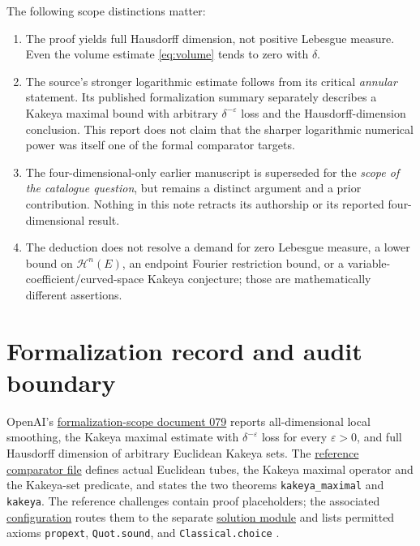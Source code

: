 \documentclass[11pt,a4paper]{article}
\numberwithin{equation}{section}
\theoremstyle{definition}
\theoremstyle{remark}
\newcommand{\eps}{\varepsilon}
\newcommand{\Hs}{\mathcal H}
\begin{document}
The following scope distinctions matter:
\begin{enumerate}[label=(\alph*)]
\item The proof yields full Hausdorff dimension, not positive
Lebesgue measure. Even the volume estimate \eqref{eq:volume} tends
to zero with $\delta$.
\item The source's stronger logarithmic estimate follows from its
critical \emph{annular} statement. Its published formalization summary
separately describes a Kakeya maximal bound with arbitrary
$\delta^{-\eps}$ loss and the Hausdorff-dimension conclusion. This
report does not claim that the sharper logarithmic numerical power
was itself one of the formal comparator targets.
\item The four-dimensional-only earlier manuscript is superseded for
the \emph{scope of the catalogue question}, but remains a distinct
argument and a prior contribution. Nothing in this note retracts
its authorship or its reported four-dimensional result.
\item The deduction does not resolve a demand for zero Lebesgue measure,
a lower bound on $\Hs^n(E)$, an endpoint Fourier restriction bound, or
a variable-coefficient/curved-space Kakeya conjecture; those are
mathematically different assertions.
\end{enumerate}

\section{Formalization record and audit boundary}
\label{sec:lean}
OpenAI's \href{https://github.com/openai/math/blob/7ef5c0cc5ca4b0e072b7a050fca09ab24bc6fa3a/lean/docs/079.md}{formalization-scope document 079}
reports all-dimensional local smoothing, the Kakeya maximal estimate
with $\delta^{-\eps}$ loss for every $\eps>0$, and full Hausdorff
dimension of arbitrary Euclidean Kakeya sets. The
\href{https://github.com/openai/math/blob/7ef5c0cc5ca4b0e072b7a050fca09ab24bc6fa3a/lean/ComparatorChallenges/LocalSmoothing.lean}{reference
comparator file} defines actual Euclidean tubes, the Kakeya maximal
operator and the Kakeya-set predicate, and states the two theorems
\texttt{kakeya\_maximal} and \texttt{kakeya}. The reference challenges
contain proof placeholders; the associated
\href{https://github.com/openai/math/blob/7ef5c0cc5ca4b0e072b7a050fca09ab24bc6fa3a/lean/ComparatorChallenges/LocalSmoothing.json}{configuration}
routes them to the separate
\href{https://github.com/openai/math/blob/7ef5c0cc5ca4b0e072b7a050fca09ab24bc6fa3a/lean/OAI/Analysis/Fourier/LocalSmoothing/Comparator.lean}{solution
module} and lists permitted axioms \texttt{propext},
\texttt{Quot.sound}, and \texttt{Classical.choice} \cite{scope,challenge,config}.
\end{document}
